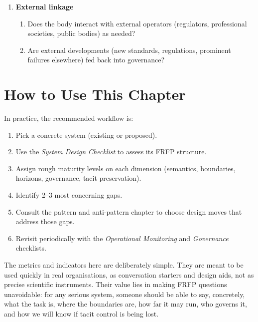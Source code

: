 \begin{enumerate}
\begin{enumerate}
                well as incident-driven meetings?
          \item Are decisions minuted, with rationale and links to
                specific evidence?
        \end{enumerate}
  \item \textbf{External linkage}
        \begin{enumerate}
          \item Does the body interact with external operators
                (regulators, professional societies, public bodies) as
                needed?
          \item Are external developments (new standards, regulations,
                prominent failures elsewhere) fed back into governance?
        \end{enumerate}
\end{enumerate}

\section{How to Use This Chapter}

In practice, the recommended workflow is:

\begin{enumerate}
  \item Pick a concrete system (existing or proposed).
  \item Use the \emph{System Design Checklist} to assess its FRFP
        structure.
  \item Assign rough maturity levels on each dimension
        (semantics, boundaries, horizons, governance, tacit
        preservation).
  \item Identify 2--3 most concerning gaps.
  \item Consult the pattern and anti-pattern chapter to choose design
        moves that address those gaps.
  \item Revisit periodically with the \emph{Operational Monitoring} and
        \emph{Governance} checklists.
\end{enumerate}

The metrics and indicators here are deliberately simple.
They are meant to be used quickly in real organisations, as conversation
starters and design aids, not as precise scientific instruments.
Their value lies in making FRFP questions unavoidable:
for any serious system, someone should be able to say, concretely,
what the task is, where the boundaries are, how far it may run, who
governs it, and how we will know if tacit control is being lost.
